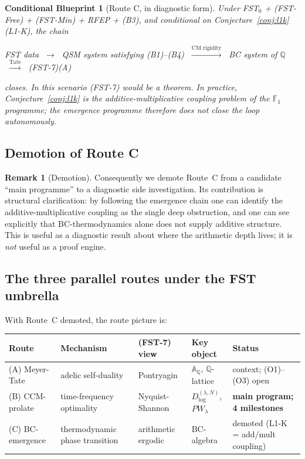 \documentclass[11pt,a4paper]{article}
\theoremstyle{plain}
\newtheorem{blueprint}[theorem]{Conditional Blueprint}
\theoremstyle{definition}
\newtheorem{remark}[theorem]{Remark}
\newcommand{\Q}{\mathbb{Q}}
\newcommand{\A}{\mathbb{A}}
\newcommand{\F}{\mathbb{F}}
\begin{document}
\begin{blueprint}[Route C, in diagnostic form]
\label{bp:route-c}
Under FST$_0$ + (FST-Free) + (FST-Min) + RFEP + (B3), \emph{and
conditional on Conjecture~\ref{conj:l1k} (L1-K)}, the chain
\begin{center}
FST data $\;\to\;$ QSM system satisfying (B1)--(B4)
$\;\xrightarrow{\text{CM rigidity}}\;$ BC system of $\Q$
$\;\xrightarrow{\text{Tate}}\;$ (FST-7)(A)
\end{center}
closes.  In this scenario (FST-7) would be a theorem.  In practice,
Conjecture~\ref{conj:l1k} is the additive-multiplicative coupling
problem of the $\F_1$ programme; the emergence programme therefore
does \emph{not} close the loop autonomously.
\end{blueprint}

\subsection{Demotion of Route C}

\begin{remark}[Demotion]
\label{rem:route-c-demotion}
Consequently we demote Route~C from a candidate ``main
programme'' to a diagnostic side investigation.  Its contribution is
structural clarification: by following the emergence chain one can
identify the additive-multiplicative coupling as the single deep
obstruction, and one can see explicitly that BC-thermodynamics
alone does not supply additive structure.  This is useful as a
diagnostic result about where the arithmetic depth lives; it is
\emph{not} useful as a proof engine.
\end{remark}

\subsection{The three parallel routes under the FST umbrella}
\label{sec:three-routes}

With Route~C demoted, the route picture is:

\begin{center}
\small
\begin{tabular}{@{}lllll@{}}
\toprule
\textbf{Route} & \textbf{Mechanism} & \textbf{(FST-7) view} &
\textbf{Key object} & \textbf{Status} \\
\midrule
(A) Meyer-Tate      & adelic self-duality & Pontryagin        &
$\A_\Q$, $\Q$-lattice & context; (O1)--(O3) open \\
(B) CCM-prolate     & time-frequency optimality & Nyquist-Shannon &
$D^{(\lambda,N)}_{\log}$, $PW_\lambda$ & \textbf{main program; 4 milestones} \\
(C) BC-emergence    & thermodynamic phase transition & arithmetic ergodic &
BC-algebra            & demoted (L1-K = add/mult coupling) \\
\bottomrule
\end{tabular}
\end{center}
\end{document}
